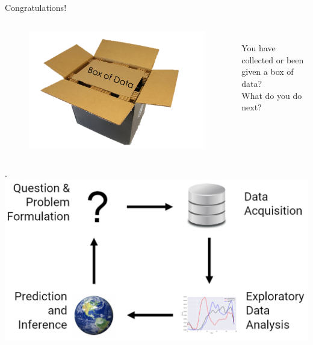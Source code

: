 \documentclass[aspectratio=169]{../latex_main/tntbeamer}  %
\begin{document}
	
	\begin{frame}{Congratulations!}
	    \begin{columns}
	    
	    \begin{column}{.4\textwidth}
	    
	    
	    \begin{figure}
	        \includegraphics[scale=.5]{Bild1}
	    \end{figure}
	   \end{column}
	   
	   \begin{column}{.4\textwidth}
	        \bigskip
	        \bigskip
	        \bigskip
	        \bigskip\\
	        You have collected or been given a box of data?\\
	        What do you do next?
	   \end{column}
	   
	   
	    \end{columns}
	\end{frame}
	
	
	\begin{frame}{.}
	    \centering
	    \includegraphics[scale=.45]{Bild2}
	\end{frame}
	
\end{document}

